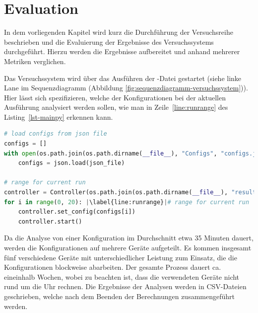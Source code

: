 \section{Evaluation} \label{sec:Evaluation}

In dem vorliegenden Kapitel wird kurz die Durchführung der Versuchsreihe beschrieben und die Evaluierung der Ergebnisse des Versuchssystems durchgeführt.
Hierzu werden die Ergebnisse aufbereitet und anhand mehrerer Metriken verglichen.

Das Versuchssystem wird über das Ausführen der -Datei gestartet (siehe linke Lane im Sequenzdiagramm (Abbildung \ref{fig:sequenzdiagramm-versuchssystem})).
Hier lässt sich spezifizieren, welche der Konfigurationen bei der aktuellen Ausführung analysiert werden sollen, wie man in Zeile~\ref{line:runrange} des Listing~\ref{lst-mainpy} erkennen kann.

\begin{lstlisting}[language=Python,numbers=none,caption=Ausführen einer Versuchsreihe,label=lst-mainpy,escapechar=|]
# load configs from json file
configs = []
with open(os.path.join(os.path.dirname(__file__), "Configs", "configs.json"), "r") as json_file:
    configs = json.load(json_file)

# range for current run
controller = Controller(os.path.join(os.path.dirname(__file__), "results.csv"))
for i in range(0, 20): |\label{line:runrange}|# range for current run
    controller.set_config(configs[i])
    controller.start()
\end{lstlisting}

Da die Analyse von einer Konfiguration im Durchschnitt etwa 35 Minuten dauert, werden die Konfigurationen auf mehrere Geräte aufgeteilt. 
Es kommen insgesamt fünf verschiedene Geräte mit unterschiedlicher Leistung zum Einsatz, die die Konfigurationen blockweise abarbeiten.
Der gesamte Prozess dauert ca. eineinhalb Wochen, wobei zu beachten ist, dass die verwendeten Geräte nicht rund um die Uhr rechnen.
Die Ergebnisse der Analysen werden in CSV-Dateien geschrieben, welche nach dem Beenden der Berechnungen zusammengeführt werden.

